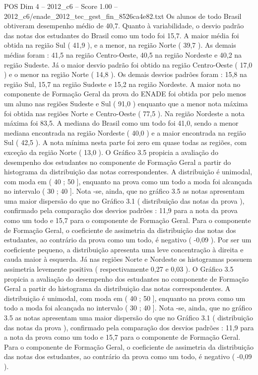 \begin{textsample}{POS Dim 4 – 2012\_c6 – Score 1.00 – 2012\_c6/enade\_2012\_tec\_gest\_fin\_8526ca4e82.txt}
Os alunos de todo Brasil obtiveram desempenho médio de 40,7.
Quanto à variabilidade, o desvio padrão das notas dos estudantes do Brasil como um todo foi 15,7.
A maior média foi obtida na região Sul ( 41,9 ), e a menor, na região Norte ( 39,7 ).
As demais médias foram : 41,5 na região Centro-Oeste, 40,5 na região Nordeste e 40,2 na região Sudeste.
Já o maior desvio padrão foi obtido na região Centro-Oeste ( 17,0 ) e o menor na região Norte ( 14,8 ).
Os demais desvios padrões foram : 15,8 na região Sul, 15,7 na região Sudeste e 15,2 na região Nordeste.
A maior nota no componente de Formação Geral da prova do ENADE foi obtida por pelo menos um aluno nas regiões Sudeste e Sul ( 91,0 ) enquanto que a menor nota máxima foi obtida nas regiões Norte e Centro-Oeste ( 77,5 ).
Na região Nordeste a nota máxima foi 83,5.
A mediana do Brasil como um todo foi 41,0, sendo a menor mediana encontrada na região Nordeste ( 40,0 ) e a maior encontrada na região Sul ( 42,5 ).
A nota mínima nesta parte foi zero em quase todas as regiões, com exceção da região Norte ( 13,0 ).
O Gráfico 3.5 propicia a avaliação do desempenho dos estudantes no componente de Formação Geral a partir do histograma da distribuição das notas correspondentes.
A distribuição é unimodal, com moda em ( 40 ; 50 ], enquanto na prova como um todo a moda foi alcançada no intervalo ( 30 ; 40 ].
Nota -se, ainda, que no gráfico 3.5 as notas apresentam uma maior dispersão do que no Gráfico 3.1 ( distribuição das notas da prova ), confirmado pela comparação dos desvios padrões : 11,9 para a nota da prova como um todo e 15,7 para o componente de Formação Geral.
Para o componente de Formação Geral, o coeficiente de assimetria da distribuição das notas dos estudantes, ao contrário da prova como um todo, é negativo ( -0,09 ).
Por ser um coeficiente pequeno, a distribuição apresenta uma leve concentração à direita e cauda maior à esquerda.
Já nas regiões Norte e Nordeste os histogramas possuem assimetria levemente positiva ( respectivamente 0,27 e 0,03 ).
O Gráfico 3.5 propicia a avaliação do desempenho dos estudantes no componente de Formação Geral a partir do histograma da distribuição das notas correspondentes.
A distribuição é unimodal, com moda em ( 40 ; 50 ], enquanto na prova como um todo a moda foi alcançada no intervalo ( 30 ; 40 ].
Nota -se, ainda, que no gráfico 3.5 as notas apresentam uma maior dispersão do que no Gráfico 3.1 ( distribuição das notas da prova ), confirmado pela comparação dos desvios padrões : 11,9 para a nota da prova como um todo e 15,7 para o componente de Formação Geral.
Para o componente de Formação Geral, o coeficiente de assimetria da distribuição das notas dos estudantes, ao contrário da prova como um todo, é negativo ( -0,09 ).

\end{textsample}
